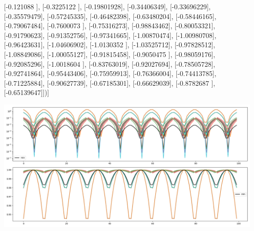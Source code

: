 \documentclass{article}
\begin{document}
       [-0.121088  ],
       [-0.3225122 ],
       [-0.19801928],
       [-0.34406349],
       [-0.33696229],
       [-0.35579479],
       [-0.57245335],
       [-0.46482398],
       [-0.63480204],
       [-0.58446165],
       [-0.79067484],
       [-0.7600073 ],
       [-0.75316273],
       [-0.98843462],
       [-0.80053321],
       [-0.91790623],
       [-0.91352756],
       [-0.97341665],
       [-1.00870474],
       [-1.00980708],
       [-0.96423631],
       [-1.04606902],
       [-1.0130352 ],
       [-1.03525712],
       [-0.97828512],
       [-1.08849086],
       [-1.00055127],
       [-0.91815458],
       [-0.9050475 ],
       [-0.98059176],
       [-0.92085296],
       [-1.0018604 ],
       [-0.83763019],
       [-0.92027694],
       [-0.78505728],
       [-0.92741864],
       [-0.95443406],
       [-0.75959913],
       [-0.76366004],
       [-0.74413785],
       [-0.71225884],
       [-0.90627739],
       [-0.67185301],
       [-0.66629039],
       [-0.8782687 ],
       [-0.65139647]])]
\begin{center}
\includegraphics[scale=.9]{report_pickled_controls20/control_dpn_all}

\end{center}
\end{document}
